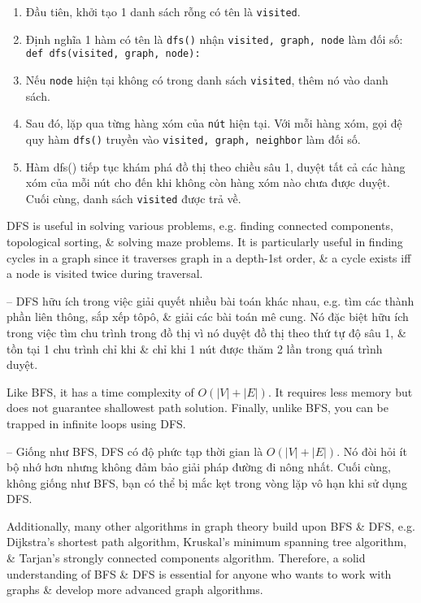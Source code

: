 \documentclass{article}
\begin{document}
\begin{itemize}
\begin{itemize}
\begin{itemize}
\begin{enumerate}
                \item Đầu tiên, khởi tạo 1 danh sách rỗng có tên là {\tt visited}.
                \item Định nghĩa 1 hàm có tên là {\tt dfs()} nhận {\tt visited, graph, node} làm đối số: {\tt def dfs(visited, graph, node):}
                \item Nếu {\tt node} hiện tại không có trong danh sách {\tt visited}, thêm nó vào danh sách.
                \item Sau đó, lặp qua từng hàng xóm của {\tt nút} hiện tại. Với mỗi hàng xóm, gọi đệ quy hàm {\tt dfs()} truyền vào {\tt visited, graph, neighbor} làm đối số.
                \item Hàm {\sf dfs()} tiếp tục khám phá đồ thị theo chiều sâu 1, duyệt tất cả các hàng xóm của mỗi nút cho đến khi không còn hàng xóm nào chưa được duyệt. Cuối cùng, danh sách {\tt visited} được trả về.
            \end{enumerate}
            DFS is useful in solving various problems, e.g. finding connected components, topological sorting, \& solving maze problems. It is particularly useful in finding cycles in a graph since it traverses graph in a depth-1st order, \& a cycle exists iff a node is visited twice during traversal.

            -- DFS hữu ích trong việc giải quyết nhiều bài toán khác nhau, e.g. tìm các thành phần liên thông, sắp xếp tôpô, \& giải các bài toán mê cung. Nó đặc biệt hữu ích trong việc tìm chu trình trong đồ thị vì nó duyệt đồ thị theo thứ tự độ sâu 1, \& tồn tại 1 chu trình chỉ khi \& chỉ khi 1 nút được thăm 2 lần trong quá trình duyệt.

            Like BFS, it has a time complexity of $O(|V| + |E|)$. It requires less memory but does not guarantee shallowest path solution. Finally, unlike BFS, you can be trapped in infinite loops using DFS.

            -- Giống như BFS, DFS có độ phức tạp thời gian là $O(|V| + |E|)$. Nó đòi hỏi ít bộ nhớ hơn nhưng không đảm bảo giải pháp đường đi nông nhất. Cuối cùng, không giống như BFS, bạn có thể bị mắc kẹt trong vòng lặp vô hạn khi sử dụng DFS.

            Additionally, many other algorithms in graph theory build upon BFS \& DFS, e.g. Dijkstra's shortest path algorithm, Kruskal's minimum spanning tree algorithm, \& Tarjan's strongly connected components algorithm. Therefore, a solid understanding of BFS \& DFS is essential for anyone who wants to work with graphs \& develop more advanced graph algorithms.


\end{itemize}
\end{itemize}
\end{itemize}
\end{document}
